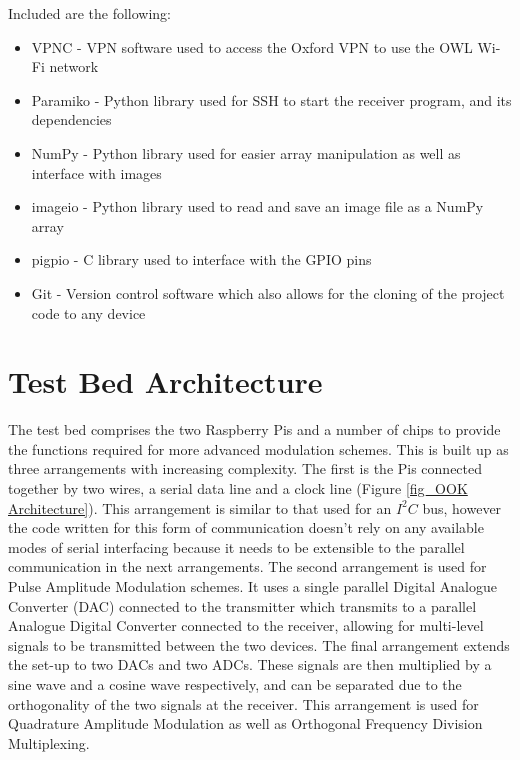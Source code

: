 \documentclass[../main.tex]{subfiles}
\begin{document}
Included are the following:

\begin{itemize}
	\item VPNC - VPN software used to access the Oxford VPN to use the OWL Wi-Fi network
	\item Paramiko - Python library used for SSH to start the receiver program, and its dependencies
	\item NumPy - Python library used for easier array manipulation as well as interface with images
	\item imageio - Python library used to read and save an image file as a NumPy array
	\item pigpio - C library used to interface with the GPIO pins
	\item Git - Version control software which also allows for the cloning of the project code to any device
\end{itemize}

\clearpage

	
\section{Test Bed Architecture}

The test bed comprises the two Raspberry Pis and a number of chips to provide the functions required for more advanced modulation schemes.
This is built up as three arrangements with increasing complexity.
The first is the Pis connected together by two wires, a serial data line and a clock line (Figure \ref{fig_OOK Architecture}).
This arrangement is similar to that used for an $I^2C$ bus, however the code written for this form of communication doesn't rely on any available modes of serial interfacing because it needs to be extensible to the parallel communication in the next arrangements.
The second arrangement is used for Pulse Amplitude Modulation schemes.
It uses a single parallel Digital Analogue Converter (DAC) connected to the transmitter which transmits to a parallel Analogue Digital Converter connected to the receiver, allowing for multi-level signals to be transmitted between the two devices.
The final arrangement extends the set-up to two DACs and two ADCs.
These signals are then multiplied by a sine wave and a cosine wave respectively, and can be separated due to the orthogonality of the two signals at the receiver.
This arrangement is used for Quadrature Amplitude Modulation as well as Orthogonal Frequency Division Multiplexing.\\
\end{document}
